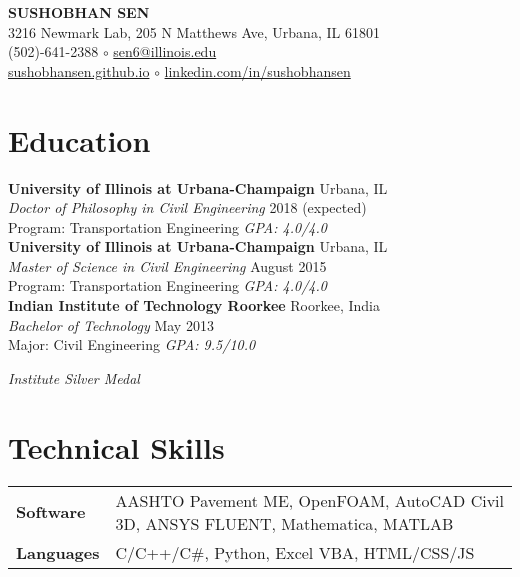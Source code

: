 \documentclass[12pt]{article}
\begin{document}
\begin{center}
{\large \uppercase{\textbf{Sushobhan Sen}}} \\
3216 Newmark Lab, 205 N Matthews Ave, Urbana, IL 61801 \\
(502)-641-2388 $\circ$ \href{mailto:sen6@illinois.edu}{sen6@illinois.edu} \\
\href{http://sushobhansen.github.io/}{sushobhansen.github.io} $\circ$ \href{http://linkedin.com/in/sushobhansen}{linkedin.com/in/sushobhansen}
\end{center} 

\hfill \break
\section*{Education}
\textbf{University of Illinois at Urbana-Champaign} \hfill Urbana, IL\\
\textit{Doctor of Philosophy in Civil Engineering} \hfill 2018 (expected)\\
Program: Transportation Engineering \hfill \textit{GPA: 4.0/4.0} \\

\textbf{University of Illinois at Urbana-Champaign} \hfill Urbana, IL\\
\textit{Master of Science in Civil Engineering} \hfill August 2015\\
Program: Transportation Engineering \hfill \textit{GPA: 4.0/4.0} \\

\textbf{Indian Institute of Technology Roorkee} \hfill Roorkee, India\\
\textit{Bachelor of Technology} \hfill May 2013\\
Major: Civil Engineering \hfill \textit{GPA: 9.5/10.0} \\
\strut \hfill \textit{Institute Silver Medal} \\

\section*{Technical Skills}
\begin{tabular}{p{10em} p{25em}}
\textbf{Software} & AASHTO Pavement ME, OpenFOAM, AutoCAD Civil 3D, ANSYS FLUENT, Mathematica, MATLAB \\
\textbf{Languages} & C/C++/C\#, Python, Excel VBA, HTML/CSS/JS
\end{tabular}
\end{document}
